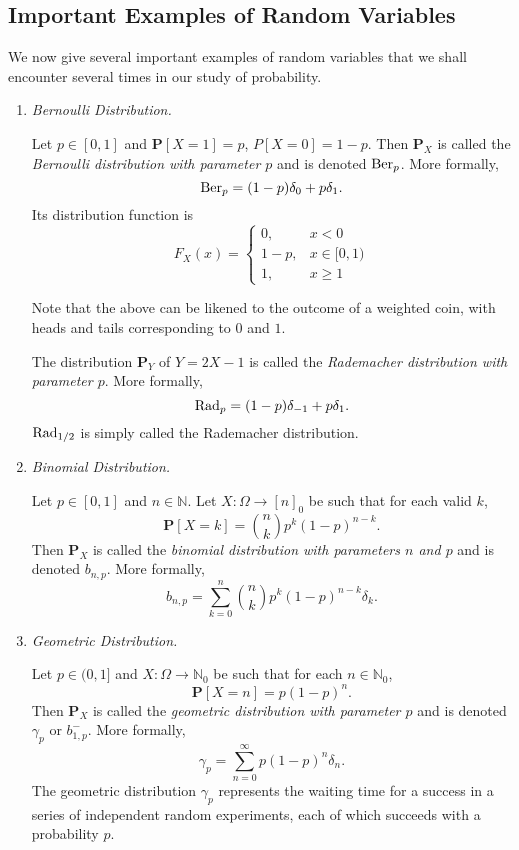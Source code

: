 \subsection{Important Examples of Random Variables}
\label{examples of random variables}

We now give several important examples of random variables that we shall encounter several times in our study of probability.

\begin{enumerate}
    \item \textit{Bernoulli Distribution.}
    
    Let $p\in[0,1]$ and $\textbf{P}[X=1]=p$, $P[X=0]=1-p$. Then $\textbf{P}_X$ is called the \textit{Bernoulli distribution with parameter $p$} and is denoted $\operatorname{Ber}_p$. More formally,
    $$\operatorname{Ber}_p=(1-p)\delta_0 + p\delta_1.$$
    Its distribution function is
    $$
    F_X(x) = 
    \begin{cases}
    0, &x<0 \\
    1-p, &x\in[0,1) \\
    1, &x\geq 1
    \end{cases}
    $$
    
    Note that the above can be likened to the outcome of a weighted coin, with heads and tails corresponding to $0$ and $1$.
    
    \vspace{2mm}
    The distribution $\textbf{P}_Y$ of $Y=2X-1$ is called the \textit{Rademacher distribution with parameter $p$}. More formally,
    $$\operatorname{Rad}_p = (1-p)\delta_{-1}+p\delta_1.$$
    $\operatorname{Rad}_{1/2}$ is simply called the Rademacher distribution.
    
    \item \textit{Binomial Distribution.}
    
    Let $p\in[0,1]$ and $n\in\mathbb{N}$. Let $X:\Omega\to[n]_0$ be such that for each valid $k$,
    $$\textbf{P}[X=k]=\binom{n}{k}p^k(1-p)^{n-k}.$$
    Then $\textbf{P}_X$ is called the \textit{binomial distribution with parameters $n$ and $p$} and is denoted $b_{n,p}$. More formally,
    $$b_{n,p}=\sum_{k=0}^n \binom{n}{k}p^k(1-p)^{n-k}\delta_k.$$
    
    \item \textit{Geometric Distribution.}
    
    Let $p\in(0,1]$ and $X:\Omega\to\mathbb{N}_0$ be such that for each $n\in\mathbb{N}_0$,
    $$\textbf{P}[X=n]=p(1-p)^n.$$
    Then $\textbf{P}_X$ is called the \textit{geometric distribution with parameter $p$} and is denoted $\gamma_p$ or $b_{1,p}^{-}$. More formally,
    $$\gamma_p=\sum_{n=0}^\infty p(1-p)^n\delta_n.$$
    The geometric distribution $\gamma_p$ represents the waiting time for a success in a series of independent random experiments, each of which succeeds with a probability $p$.
    

\end{enumerate}
